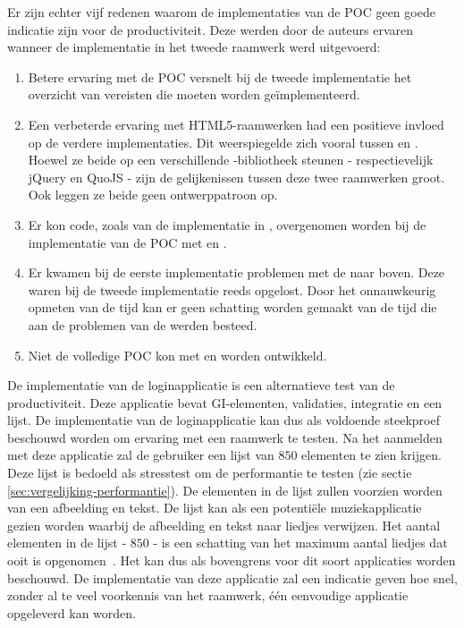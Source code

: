 Er zijn echter vijf redenen waarom de implementaties van de POC geen goede indicatie zijn voor de productiviteit.
Deze werden door de auteurs ervaren wanneer de implementatie in het tweede raamwerk werd uitgevoerd:
\begin{enumerate}
\item Betere ervaring met de POC versnelt bij de tweede implementatie het overzicht van vereisten die moeten worden geïmplementeerd. 
\item Een verbeterde ervaring met HTML5-raamwerken had een positieve invloed op de verdere implementaties.
Dit weerspiegelde zich vooral tussen \jqm{} en \lungo{}.
Hoewel ze beide op een verschillende \js{}-bibliotheek steunen - respectievelijk jQuery en QuoJS - zijn de gelijkenissen tussen deze twee raamwerken groot.
Ook leggen ze beide geen ontwerppatroon op.
\item Er kon code,  zoals van de implementatie in \jqm{},  overgenomen worden bij de implementatie van de POC met \lungo{} en \kendo{}.
\item Er kwamen bij de eerste implementatie problemen met de  naar boven.
Deze waren bij de tweede implementatie reeds opgelost.
Door het onnauwkeurig opmeten van de tijd kan er geen schatting worden gemaakt van de tijd die aan de problemen van de  werden besteed.
\item Niet de volledige POC kon met \lungo{} en \st{} worden ontwikkeld.
\end{enumerate}

De implementatie van de loginapplicatie is een alternatieve test van de productiviteit.
Deze applicatie bevat GI-elementen, validaties,   integratie en een lijst.
De implementatie van de loginapplicatie kan dus als voldoende steekproef beschouwd worden om ervaring met een raamwerk te testen.
Na het aanmelden met deze applicatie zal de gebruiker een lijst van $850$ elementen te zien krijgen.
Deze lijst is bedoeld als stresstest om de performantie te testen (zie sectie \ref{sec:vergelijking-performantie}).
De elementen in de lijst zullen voorzien worden van een afbeelding en tekst.
De lijst kan als een potentiële muziekapplicatie gezien worden waarbij de afbeelding en tekst naar liedjes verwijzen.
Het aantal elementen in de lijst - $850$ - is een schatting van het maximum aantal liedjes dat ooit is opgenomen~\cite{Zimmy2011}.
Het kan dus als bovengrens voor dit soort applicaties worden beschouwd.
De implementatie van deze applicatie zal een indicatie geven hoe snel,  zonder al te veel voorkennis van het raamwerk,  één eenvoudige applicatie opgeleverd kan worden.

